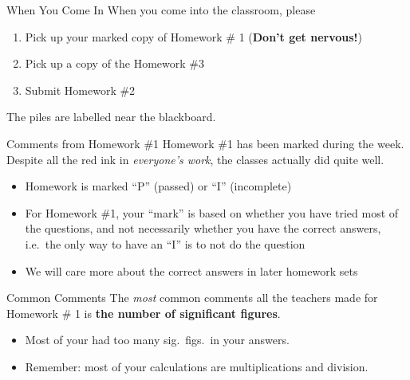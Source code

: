 \documentclass[12pt,compress,aspectratio=169]{beamer}
\begin{document}
%


\begin{frame}{When You Come In}
  When you come into the classroom, please
  \begin{enumerate}
  \item Pick up your marked copy of Homework \# 1 (\textbf{Don't get nervous!})
  \item Pick up a copy of the Homework \#3
  \item Submit Homework \#2
  \end{enumerate}
  The piles are labelled near the blackboard.
\end{frame}



\begin{frame}{Comments from Homework \#1}
  Homework \#1 has been marked during the week. Despite all the red ink in
  \emph{everyone's work}, the classes actually did quite well.

  \vspace{.2in}
  \begin{itemize}
  \item Homework is marked ``P'' (passed) or ``I'' (incomplete)
  \item For Homework \#1, your ``mark'' is based on whether you have tried most
    of the questions, and not necessarily whether you have the correct answers,
    i.e.\ the only way to have an ``I'' is to not do the question
  \item We will care more about the correct answers in later homework sets
  \end{itemize}
\end{frame}



\begin{frame}{Common Comments}
  The \emph{most} common comments all the teachers made for Homework \# 1
  is \textbf{the number of significant figures}.
  \begin{itemize}
  \item Most of your had too many sig.\ figs.\ in your answers.
  \item Remember: most of your calculations are multiplications and division.
%
%
%
  \end{itemize}
\end{frame}
\end{document}
